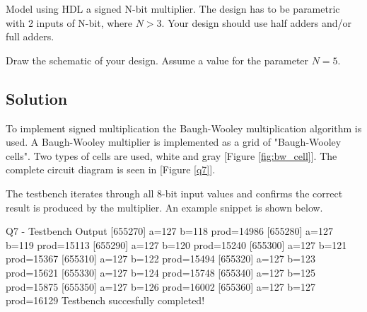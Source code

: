 \documentclass[../main.tex]{subfiles}
\begin{document}
Model using HDL a signed N-bit multiplier. The design has to be parametric with 2 inputs of N-bit, where $N > 3$. Your design should use half adders and/or full adders.

Draw the schematic of your design. Assume a value for the parameter $N = 5$.

\subsection*{Solution}

To implement signed multiplication the Baugh-Wooley multiplication algorithm is used. A Baugh-Wooley multiplier is implemented as a grid of "Baugh-Wooley cells". Two types of cells are used, white and gray [Figure \ref{fig:bw_cell}]. The complete circuit diagram is seen in [Figure \ref{q7}].

The testbench iterates through all 8-bit input values and confirms the correct result is produced by the multiplier. An example snippet is shown below.

\begin{mintedterminal}{Q7 - Testbench Output}
[655270] a=127 b=118 prod=14986
[655280] a=127 b=119 prod=15113
[655290] a=127 b=120 prod=15240
[655300] a=127 b=121 prod=15367
[655310] a=127 b=122 prod=15494
[655320] a=127 b=123 prod=15621
[655330] a=127 b=124 prod=15748
[655340] a=127 b=125 prod=15875
[655350] a=127 b=126 prod=16002
[655360] a=127 b=127 prod=16129
Testbench succesfully completed!
\end{mintedterminal}
\end{document}
